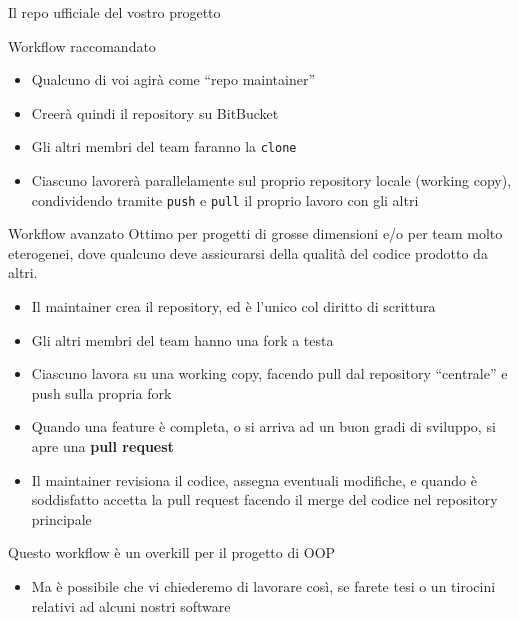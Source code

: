 \documentclass[presentation]{beamer}
\begin{document}
\begin{frame}[allowframebreaks]{Il repo ufficiale del vostro progetto}
	\begin{block}{Workflow raccomandato}
		\begin{itemize}
			\item Qualcuno di voi agirà come ``repo maintainer''
			\item Creerà quindi il repository su BitBucket
			\item Gli altri membri del team faranno la \texttt{clone}
			\item Ciascuno lavorerà parallelamente sul proprio repository locale (working copy), condividendo tramite \texttt{push} e \texttt{pull} il proprio lavoro con gli altri
		\end{itemize}
	\end{block}
	\begin{block}{Workflow avanzato}
		Ottimo per progetti di grosse dimensioni e/o per team molto eterogenei, dove qualcuno deve assicurarsi della qualità del codice prodotto da altri.
		\begin{itemize}
			\item Il maintainer crea il repository, ed è l'unico col diritto di scrittura
			\item Gli altri membri del team hanno una fork a testa
			\item Ciascuno lavora su una working copy, facendo pull dal repository ``centrale'' e push sulla propria fork
			\item Quando una feature è completa, o si arriva ad un buon gradi di sviluppo, si apre una \textbf{pull request}
			\item Il maintainer revisiona il codice, assegna eventuali modifiche, e quando è soddisfatto accetta la pull request facendo il merge del codice nel repository principale
		\end{itemize}
		Questo workflow è un overkill per il progetto di OOP
		\begin{itemize}
			\item Ma è possibile che vi chiederemo di lavorare così, se farete tesi o un tirocini relativi ad alcuni nostri software
		\end{itemize}
	\end{block}
\end{frame}
\end{document}
